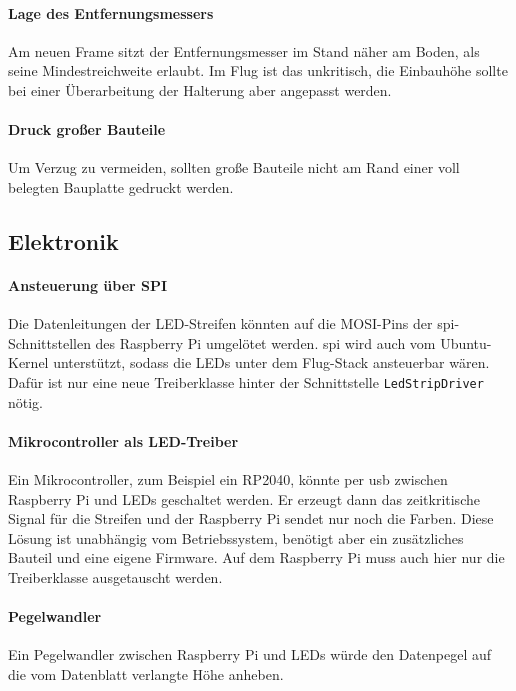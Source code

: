     \paragraph{Lage des Entfernungsmessers}
    Am neuen Frame sitzt der Entfernungsmesser im Stand näher am Boden, als seine Mindestreichweite erlaubt. Im Flug ist das unkritisch, die Einbauhöhe sollte bei einer Überarbeitung der Halterung aber angepasst werden.

    \paragraph{Druck großer Bauteile}
    Um Verzug zu vermeiden, sollten große Bauteile nicht am Rand einer voll belegten Bauplatte gedruckt werden.

    \subsection{Elektronik}
    \label{sec:Ausblick_Elektronik}

    \paragraph{Ansteuerung über SPI}
    Die Datenleitungen der LED-Streifen könnten auf die MOSI-Pins der \gls{spi}-Schnittstellen des Raspberry Pi umgelötet werden. \gls{spi} wird auch vom Ubuntu-Kernel unterstützt, sodass die LEDs unter dem Flug-Stack ansteuerbar wären. Dafür ist nur eine neue Treiberklasse hinter der Schnittstelle \texttt{LedStripDriver} nötig.

    \paragraph{Mikrocontroller als LED-Treiber}
    Ein Mikrocontroller, zum Beispiel ein RP2040, könnte per \gls{usb} zwischen Raspberry Pi und LEDs geschaltet werden. Er erzeugt dann das zeitkritische Signal für die Streifen und der Raspberry Pi sendet nur noch die Farben. Diese Lösung ist unabhängig vom Betriebssystem, benötigt aber ein zusätzliches Bauteil und eine eigene Firmware. Auf dem Raspberry Pi muss auch hier nur die Treiberklasse ausgetauscht werden.

    \paragraph{Pegelwandler}
    Ein Pegelwandler zwischen Raspberry Pi und LEDs würde den Datenpegel auf die vom Datenblatt verlangte Höhe anheben.

